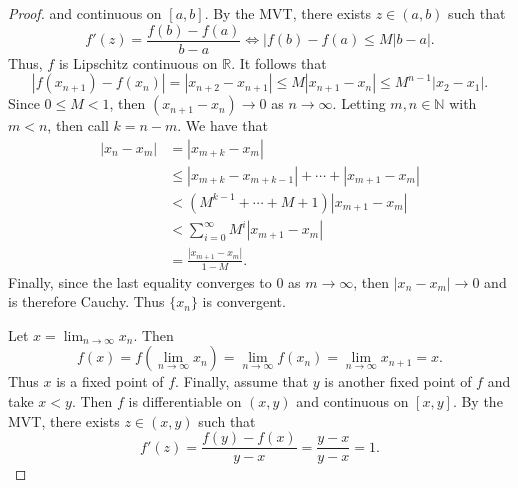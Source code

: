 \documentclass[12pt]{article}
\begin{document}
\begin{enumerate}
\begin{proof}
                and continuous on $[a, b]$. By the MVT, there exists $z\in(a,
                b)$ such that 
                \begin{equation*}
                    f'(z)=\frac{f(b)-f(a)}{b-a}\Leftrightarrow |f(b)-f(a)\leq
                    M|b-a|. 
                \end{equation*}
                Thus, $f$ is Lipschitz continuous on $\mathbb{R}$. It follows
                that 
                \begin{equation*}
                    |f(x_{n+1})-f(x_n)|=|x_{n+2}-x_{n+1}|\leq
                    M|x_{n+1}-x_n|\leq M^{n-1}|x_{2}-x_1|.
                \end{equation*}
                Since $0\leq M<1$, then $(x_{n+1}-x_n)\to 0$ as $n\to\infty$.
                Letting $m, n\in\mathbb{N}$ with $m<n$, then call $k=n-m$. We
                have that 
                \begin{align*}
                    |x_n-x_m|&=|x_{m+k}-x_m| \\
                    &\leq |x_{m+k}-x_{m+k-1}|+\cdots+|x_{m+1}-x_m| \\
                    &< (M^{k-1}+\cdots+M+1)|x_{m+1}-x_m| \\
                    &<\sum_{i=0}^{\infty}M^i|x_{m+1}-x_m| \\
                    &=\frac{|x_{m+1}-x_m|}{1-M}.
                \end{align*}
                Finally, since the last equality converges to 0 as
                $m\to\infty$, then $|x_n-x_m|\to 0$ and is therefore Cauchy.
                Thus $\{x_n\}$ is convergent. \par\hspace{4mm} Let 
                $x=\lim_{n\to\infty}x_n$. Then
                \begin{equation*}
                    f(x)=f(\lim_{n\to\infty}x_n)=\lim_{n\to\infty}f(x_n)
                    =\lim_{n\to\infty}x_{n+1}=x.
                \end{equation*}
                Thus $x$ is a fixed point of $f$. Finally, assume that $y$ is
                another fixed point of $f$ and take $x<y$. Then $f$ is
                differentiable on $(x, y)$ and continuous on $[x, y]$. By the
                MVT, there exists $z\in(x, y)$ such that 
                \begin{equation*}
                    f'(z)=\frac{f(y)-f(x)}{y-x}=\frac{y-x}{y-x}=1.
                \end{equation*}

\end{proof}
\end{enumerate}
\end{document}
